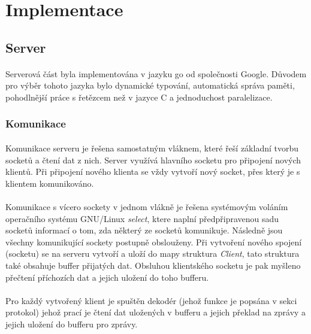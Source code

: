 \documentclass[12pt, a4paper]{article}
\begin{document}
\newpage
\section{Implementace}
\subsection{Server}
\paragraph{}
Serverová část byla implementována v jazyku go od společnosti Google. Důvodem pro výběr tohoto jazyka bylo dynamické
typování, automatická správa paměti, pohodlnější práce s řetězcem než v jazyce C a jednoduchost paralelizace.

\subsubsection{Komunikace}
\paragraph{}
Komunikace serveru je řešena samostatným vláknem, které řeší základní tvorbu socketů a čtení dat z nich. Server
využívá hlavního socketu pro připojení nových klientů. Při připojení nového klienta se vždy vytvoří nový socket, přes
který je s klientem komunikováno.

\paragraph{}
Komunikace s vícero sockety v jednom vlákně je řešena systémovým voláním operačního systému GNU/Linux \textit{select},
ktere naplní předpřipravenou sadu socketů informací o tom, zda některý ze socketů komunikuje. Následně jsou všechny
komunikující sockety postupně obslouženy. Při vytvoření nového spojení (socketu) se na serveru vytvoří a uloží do mapy
struktura \textit{Client}, tato struktura také obsahuje buffer přijatých dat. Obsluhou klientského socketu je pak
myšleno přečtení příchozích dat a jejich uložení do toho bufferu.

\paragraph{}
Pro každý vytvořený klient je spuštěn dekodér (jehož funkce je popsána v sekci protokol) jehož prací je čtení dat
uložených v bufferu a jejich překlad na zprávy a jejich uložení do bufferu pro zprávy.
\end{document}
